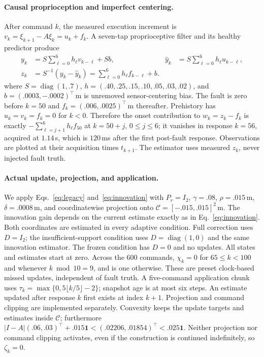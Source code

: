 \paragraph{Causal proprioception and imperfect centering.}
After command $k$, the measured execution increment is
$v_k=\xi_{k+1}-A\xi_k=u_k+f_k$. A seven-tap proprioceptive filter and its healthy
predictor produce
\begin{equation}
\begin{aligned}
y_k&=S\sum_{\ell=0}^6h_\ell v_{k-\ell}+Sb,&
\widehat y_k&=S\sum_{\ell=0}^6h_\ell u_{k-\ell},\\
z_k&=S^{-1}(y_k-\widehat y_k)
 =\sum_{\ell=0}^6h_\ell f_{k-\ell}+b.
\end{aligned}
\label{eq:construction-sensor}
\end{equation}
where $S=\operatorname{diag}(1,.7)$,
$h=(.40,.25,.15,.10,.05,.03,.02)$, and
$b=(.0003,-.0002)^\top$\,m is unremoved sensor-centering bias.
The fault is zero before $k=50$ and
$f_k=(.006,.0025)^\top$\,m thereafter. Prehistory has $u_k=v_k=f_k=0$ for
$k<0$. Therefore the onset contribution to $w_k=z_k-f_k$ is exactly
$-\sum_{\ell=j+1}^6h_\ell f_{50}$ at $k=50+j$, $0\le j\le6$;
it vanishes in response $k=56$, acquired at $1.14$\,s, which is $120$\,ms
after the first post-fault response. Observations are plotted at their
acquisition times $t_{k+1}$.
The estimator uses measured $z_k$, never injected fault truth.

\paragraph{Actual update, projection, and application.}
We apply Eqs.~\eqref{eq:legacy} and~\eqref{eq:innovation} with
$P_r=I_2$, $\gamma=.08$, $\rho=.015$\,m, $\delta=.0008$\,m, and
coordinatewise projection onto $\mathcal C=[-.015,.015]^2$\,m. The innovation
gain depends on the current estimate exactly as in Eq.~\eqref{eq:innovation}.
Both coordinates are estimated in every adaptive condition. Full correction
uses $D=I_2$; the insufficient-support condition uses
$D=\operatorname{diag}(1,0)$ and the same innovation estimator. The frozen
condition has $D=0$ and no updates.
All states and estimates start at zero. Across the $600$ commands,
$\chi_k=0$ for $65\le k<100$ and whenever $k\bmod10=9$, and is one otherwise.
These are preset clock-based missed updates, independent of fault truth.
A five-command application chunk uses
$\tau_k=\max\{0,5\lfloor k/5\rfloor-2\}$; snapshot age is at most six steps.
An estimate updated after response $k$ first exists at index $k+1$.
Projection and command clipping are implemented separately. Convexity keeps
the update targets and estimates inside $\mathcal C$; furthermore
$|I-A|(.06,.03)^\top+.015\mathbf1<(.02206,.01854)^\top<.025\mathbf1$.
Neither projection nor command clipping activates, even if the construction
is continued indefinitely, so $\zeta_k=0$.

